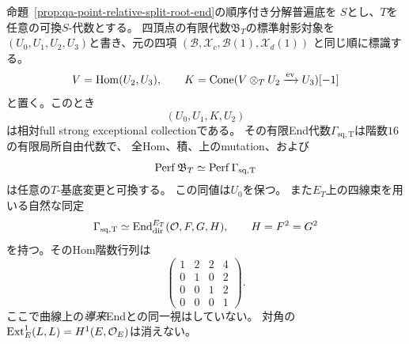 \begin{proposition}[対称squareへの相対mutation]
\label{prop:qa-symmetric-square-relative-mutation}
命題~\ref{prop:qa-point-relative-split-root-end}の順序付き分解普遍底を
$S$とし、$T$を任意の可換$S$-代数とする。
四頂点の有限代数$\mathfrak B_T$の標準射影対象を
$(U_0,U_1,U_2,U_3)$と書き、元の四項
$(\mathcal B,\mathcal X_c,\mathcal B(1),\mathcal X_d(1))$
と同じ順に標識する。
\[
 V=\operatorname{Hom}(U_2,U_3),\qquad
 K=\operatorname{Cone}(V\otimes_TU_2\xrightarrow{\mathrm{ev}}U_3)[-1]
\]
と置く。このとき
\begin{equation}
 (U_0,U_1,K,U_2)
 \tag{Sym-square}\label{eq:qa-symmetric-square-foundation}
\end{equation}
は相対full strong exceptional collectionである。
その有限End代数$\Gamma_{\mathrm{sq,T}}$は階数$16$の有限局所自由代数で、
全Hom、積、上のmutation、および
\[
 \operatorname{Perf}\mathfrak B_T\simeq\operatorname{Perf}\Gamma_{\mathrm{sq,T}}
\]
は任意の$T$-基底変更と可換する。
この同値は$U_0$を保つ。
また$E_T$上の四線束を用いる自然な同定
\begin{equation}
 \Gamma_{\mathrm{sq,T}}\simeq
 \operatorname{End}_{\mathrm{dir}}^{E_T}(\mathcal O,F,G,H),\qquad H=F^2=G^2
 \label{eq:qa-symmetric-square-curve-end}
\end{equation}
を持つ。そのHom階数行列は
\[
 \begin{pmatrix}
 1&2&2&4\\0&1&0&2\\0&0&1&2\\0&0&0&1
 \end{pmatrix}.
\]
ここで曲線上の\emph{導来}Endとの同一視はしていない。
対角の$\operatorname{Ext}^1_E(L,L)=H^1(E,\mathcal O_E)$は消えない。
\end{proposition}
